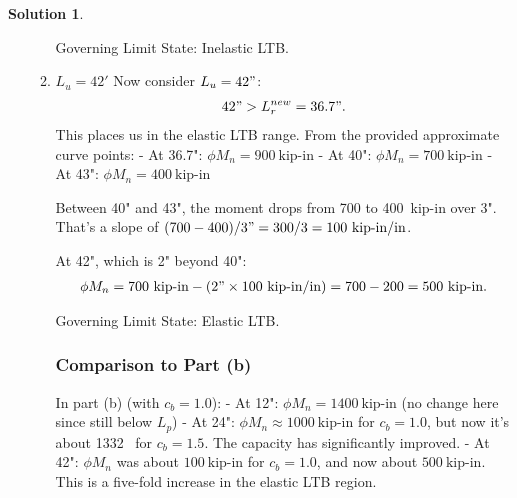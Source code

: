 \documentclass[12pt]{article}
\theoremstyle{definition} %
\newtheorem{solution}{Solution}
\theoremstyle{plain} %
\begin{document}
\begin{solution}
\begin{enumerate}
\begin{enumerate}
Governing Limit State: Inelastic LTB.

\item $L_u = 42'$
Now consider $L_u = 42"$:
\begin{align}
42" > L_r^{new} = 36.7".
\end{align}
This places us in the elastic LTB range. From the provided approximate curve points:
- At 36.7": $\phi M_n = 900~\text{kip-in}$
- At 40": $\phi M_n = 700~\text{kip-in}$
- At 43": $\phi M_n = 400~\text{kip-in}$

Between 40" and 43", the moment drops from 700 to 400~kip-in over 3". That’s a slope of $(700 - 400)/3" = 300/3 = 100~\text{kip-in/in}$.

At 42", which is 2" beyond 40":
\begin{align}
\phi M_n = 700~\text{kip-in} - (2" \times 100~\text{kip-in/in}) = 700 - 200 = 500~\text{kip-in}.
\end{align}

Governing Limit State: Elastic LTB.

\subsubsection*{Comparison to Part (b)}
In part (b) (with $ c_b = 1.0 $):
- At 12": $\phi M_n = 1400~\text{kip-in}$ (no change here since still below $L_p$)
- At 24": $\phi M_n \approx 1000~\text{kip-in}$ for $c_b=1.0$, but now it’s about 1332~ for $c_b=1.5$. The capacity has significantly improved.
- At 42": $\phi M_n$ was about $100~\text{kip-in}$ for $c_b=1.0$, and now about $500~\text{kip-in}$. This is a five-fold increase in the elastic LTB region.


 
\end{enumerate}
        \end{enumerate}
    \end{solution}
\pagebreak
\end{document}
